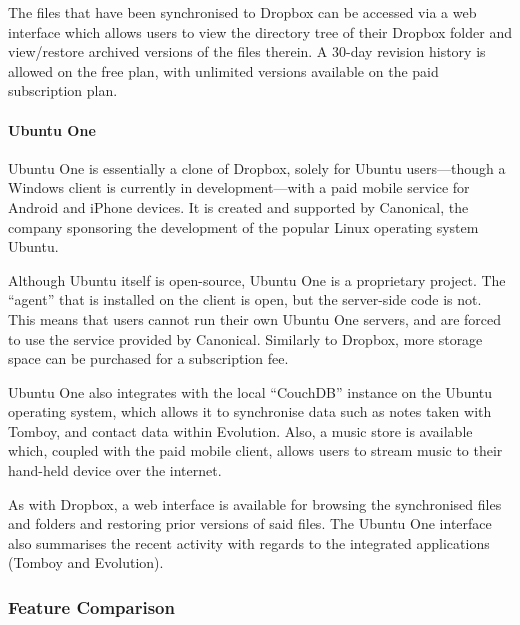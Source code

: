 The files that have been synchronised to Dropbox can be accessed via a web
interface which allows users to view the directory tree of their Dropbox folder
and view/restore archived versions of the files therein. A 30-day revision
history is allowed on the free plan, with unlimited versions available on the
paid subscription plan.

\paragraph{Ubuntu One}

Ubuntu One is essentially a clone of Dropbox, solely for Ubuntu users---though
a Windows client is currently in development---with a paid mobile service for
Android and iPhone devices. It is created and supported by Canonical, the
company sponsoring the development of the popular Linux operating system
Ubuntu.

Although Ubuntu itself is open-source, Ubuntu One is a proprietary project. The
``agent'' that is installed on the client is open, but the server-side code is
not. This means that users cannot run their own Ubuntu One servers, and are
forced to use the service provided by Canonical. Similarly to Dropbox, more storage space can
be purchased for a subscription fee.

Ubuntu One also integrates with the local ``CouchDB'' instance on the Ubuntu
operating system, which allows it to synchronise data such as notes taken with
Tomboy, and contact data within Evolution. Also, a music store is available
which, coupled with the paid mobile client, allows users to stream music to
their hand-held device over the internet.

As with Dropbox, a web interface is available for browsing the synchronised
files and folders and restoring prior versions of said files. The Ubuntu One
interface also summarises the recent activity with regards to the integrated
applications (Tomboy and Evolution).


\subsubsection{Feature Comparison}

